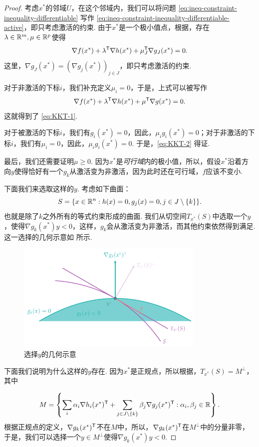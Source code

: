 \begin{proof}
考虑$x^*$的邻域$U$，在这个邻域内，我们可以将问题 \eqref{eq:ineq-constraint-inequality-differentiable} 写作 \eqref{eq:ineq-constraint-inequality-differentiable-active}，即只考虑激活的约束. 由于$x^*$是一个极小值点，根据，存在$\lambda\in\mathbb{R}^m,\mu\in\mathbb{R}^p$使得
\[
\nabla f(x^*)+\lambda^{\mathsf{T}} \nabla {h(x^*)}+\mu_J^{\mathsf{T}} \nabla g_J(x^*)=0.
\]
这里，$\nabla g_J(x^*)=(\nabla g_j(x^*))_{j\in J}$，即只考虑激活的约束.

对于非激活的下标$i$，我们补充定义$\mu_i=0$，于是，上式可以被写作
\[\nabla f(x^*)+\lambda^{\mathsf{T}} \nabla {h(x^*)}+\mu^{\mathsf{T}} \nabla g(x^*)=0.\]
这就得到了 \eqref{eq:KKT-1}.

对于被激活的下标$i$，我们有$g_i(x^*)=0$，因此，$\mu_i g_i(x^*)=0$；对于非激活的下标$i$，我们有$\mu_i=0$，因此，$\mu_i g_i(x^*)=0$. 于是，\eqref{eq:KKT-2} 得证.

最后，我们还需要证明$\mu\geq 0$. 因为$x^*$是\emph{可行域}内的极小值，所以，假设$x^*$沿着方向$y$使得恰好有一个$g_k$从激活变为非激活，因为此时还在可行域，$f$应该不变小. 

下面我们来选取这样的$y$. 考虑如下曲面：
\[S=\{x\in\mathbb{R}^n:h(x)=0,g_j(x)=0, j\in J\setminus\{k\}\}.\]
也就是除了$k$之外所有的等式约束形成的曲面. 我们从切空间$T_{x^*}(S)$中选取一个$y$，使得$\nabla g_k(x^*)y<0$，这样，$g_k$会从激活变为非激活，而其他约束依然得到满足. 这一选择的几何示意如 所示.

\begin{figure}[ht]
    \centering
    \includegraphics[width=0.8\textwidth]{figures/duality/select-y.pdf}
    \caption{选择$y$的几何示意}
    \label{fig:select-y}
\end{figure}

下面我们说明为什么这样的$y$存在. 因为$x^*$是正规点，所以根据，$T_{x^*}(S)=M^\perp$，其中

\[M=\left\{\sum_{i} \alpha_i \nabla h_i(x^*)^{\mathsf{T}}+\sum_{j\in J\setminus\{k\}} \beta_j \nabla g_j(x^*)^{\mathsf{T}}:\alpha_i,\beta_j\in\mathbb{R}\right\}.\]
根据正规点的定义，$\nabla g_k(x^*)^{\mathsf{T}}$不在$M$中，所以，$\nabla g_k(x^*)^{\mathsf{T}}$在$M^\perp$中的分量非零，于是，我们可以选择一个$y\in M^\perp$使得$\nabla g_k(x^*)y<0$. 


\end{proof}
